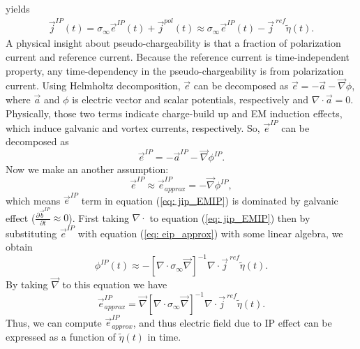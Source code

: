 \documentclass[a4paper, 11pt]{article}
\renewcommand{\div}{\nabla\cdot}
\newcommand{\grad}{\vec \nabla}
\newcommand{\siginf}{\sigma_\infty}
\renewcommand {\j}  { {\vec j} }
\renewcommand {\b}  { {\vec b} }
\newcommand {\e}  { {\vec e} }
\newcommand{\peta}{\tilde{\eta}}
\begin{document}
yields
\begin{eqnarray}
  \j^{IP}(t) = \siginf\e^{IP}(t) + \j^{pol}(t) \approx \siginf\e^{IP}(t) -\j^{\ ref}\peta(t).
  \label{eq: jip_EMIP}
\end{eqnarray}
A physical insight about pseudo-chargeability is that a fraction of polarization current and reference current. Because the reference current is time-independent property, any time-dependency in the pseudo-chargeability is from polarization current. Using Helmholtz decomposition, $\e$ can be decomposed as $\e=-\vec{a}-\grad\phi$, where $\vec{a}$ and $\phi$ is electric vector and scalar potentials, respectively and $\div\vec{a}=0$. Physically, those two terms indicate charge-build up and EM induction effects, which induce galvanic and vortex currents, respectively. So, $\e^{IP}$ can be decomposed as
\begin{equation}
  \e^{IP}=-\vec{a}^{IP}-\grad\phi^{IP}.
\end{equation}
Now we make an another assumption:
\begin{equation}
  \e^{IP} \approx  \e^{IP}_{approx} = -\grad\phi^{IP},
  \label{eq: eip_approx}
\end{equation}
which means $\e^{IP}$ term in equation (\ref{eq: jip_EMIP}) is dominated by galvanic effect ($\frac{\partial\b^{IP}}{\partial t}\approx 0$). First taking $\div$ to equation (\ref{eq: jip_EMIP}) then by substituting  $\e^{IP}$ with equation (\ref{eq: eip_approx}) with some linear algebra, we obtain
\begin{equation}
  \phi^{IP}(t) \approx -[\div \siginf\grad]^{-1}\div\j^{\ ref}\peta(t).
  \label{eq: phiIPapprox_general}
\end{equation}
By taking $\grad$ to this equation we have
\begin{equation}
    \e^{IP}_{approx} = \grad[\div \siginf\grad]^{-1}\div\j^{\ ref}\peta(t).
    \label{eq: eip_approx_full}
\end{equation}
Thus, we can compute $\e^{IP}_{approx}$, and thus electric field due to IP effect can be expressed as a function of $\peta(t)$ in time.
\end{document}
